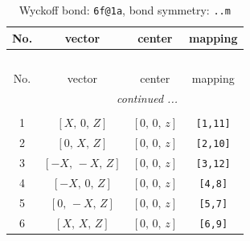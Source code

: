 \documentclass[fleqn,8pt]{jsarticle}
\begin{document}
\begin{longtable}{cccc}
\caption{Wyckoff bond: {\tt 6f@1a}, bond symmetry: {\tt ..m}}
 \\
 \hline \hline
No. & vector & center & mapping \\ \hline \endfirsthead

\multicolumn{3}{l}{\tablename\ \thetable{}} \\
 \hline \hline
No. & vector & center & mapping \\ \hline \endhead

 \hline \hline
\multicolumn{3}{r}{\footnotesize\it continued ...} \\ \endfoot

 \hline \hline
\multicolumn{3}{r}{} \\ \endlastfoot

1 & $\left[ X,\, 0,\, Z \right]$ & $\left[ 0,\, 0,\, z \right]$ & {\tt [1,11]} \\ \hline
2 & $\left[ 0,\, X,\, Z \right]$ & $\left[ 0,\, 0,\, z \right]$ & {\tt [2,10]} \\ \hline
3 & $\left[ - X,\, - X,\, Z \right]$ & $\left[ 0,\, 0,\, z \right]$ & {\tt [3,12]} \\ \hline
4 & $\left[ - X,\, 0,\, Z \right]$ & $\left[ 0,\, 0,\, z \right]$ & {\tt [4,8]} \\ \hline
5 & $\left[ 0,\, - X,\, Z \right]$ & $\left[ 0,\, 0,\, z \right]$ & {\tt [5,7]} \\ \hline
6 & $\left[ X,\, X,\, Z \right]$ & $\left[ 0,\, 0,\, z \right]$ & {\tt [6,9]} \\
\end{longtable}
\renewcommand{\arraystretch}{1.2}
\end{document}
